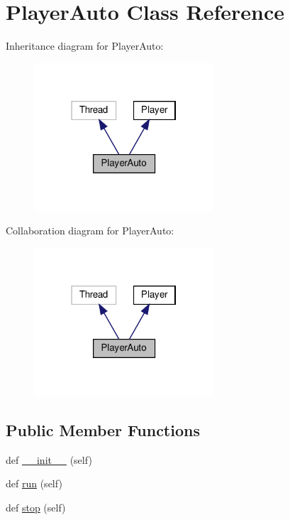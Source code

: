 \hypertarget{class_client_1_1_player_auto}{}\section{Player\+Auto Class Reference}
\label{class_client_1_1_player_auto}


Inheritance diagram for Player\+Auto\+:
\nopagebreak
\begin{figure}[H]
\begin{center}
\leavevmode
\includegraphics[width=190pt]{class_client_1_1_player_auto__inherit__graph}
\end{center}
\end{figure}


Collaboration diagram for Player\+Auto\+:
\nopagebreak
\begin{figure}[H]
\begin{center}
\leavevmode
\includegraphics[width=190pt]{class_client_1_1_player_auto__coll__graph}
\end{center}
\end{figure}
\subsection*{Public Member Functions}
\begin{DoxyCompactItemize}
\item 
def \hyperlink{class_client_1_1_player_auto_ae64f0875afe3067b97ba370b354b9213}{\+\_\+\+\_\+init\+\_\+\+\_\+} (self)
\item 
def \hyperlink{class_client_1_1_player_auto_ad22709b2e67308af35f55680d5a026e0}{run} (self)
\item 
def \hyperlink{class_client_1_1_player_auto_a26ca7c1c7fcdd35378e7be97727047a6}{stop} (self)
\end{DoxyCompactItemize}
